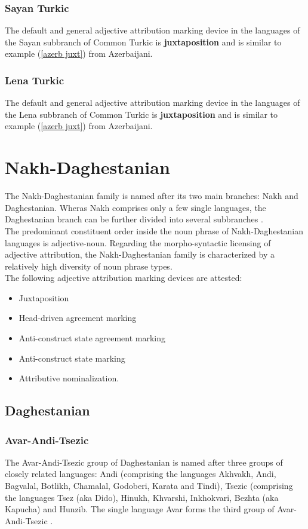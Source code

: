 \subsubsection{Sayan Turkic}
The default and general adjective attribution marking device in the languages of the Sayan subbranch of Common Turkic is \textbf{juxtaposition}  and is similar to example (\ref{azerb juxt}) from Azerbaijani.

\subsubsection{Lena Turkic}
The default and general adjective attribution marking device in the languages of the Lena subbranch of Common Turkic is \textbf{juxtaposition}  and is similar to example (\ref{azerb juxt}) from Azerbaijani.

\section{Nakh-Daghestanian}
The Nakh-Daghestanian family is named after its two main branches: Nakh and Daghestanian. Wheras Nakh comprises only a few single languages, the Daghestanian branch can be further divided into several subbranches \cite[220, 233]{salminen2007}.\\

\noindent The predominant constituent order inside the noun phrase of Nakh-Dagh\-estan\-ian languages is adjective-noun. Regarding the morpho-syntactic licensing of adjective attribution, the Nakh-Daghestanian family is characterized by a relatively high diversity of noun phrase types.\\

\noindent The following adjective attribution marking devices are attested:
\begin{itemize}
\item Juxtaposition
\item Head-driven agreement marking
\item Anti-construct state agreement marking
\item Anti-construct state marking
\item Attributive nominalization.
\end{itemize}

\subsection{Daghestanian}

\subsubsection{Avar-Andi-Tsezic}
The Avar-Andi-Tsezic group of Daghestanian is named after three groups of closely related languages: Andi (comprising the languages Akhvakh, Andi, Bagvalal, Botlikh, Chamalal, Godoberi, Karata and Tindi), Tsezic (comprising the languages Tsez (aka Dido), Hinukh, Khvarshi, Inkhokvari, Bezhta (aka Kapucha) and Hunzib. The single language Avar forms the third group of Avar-Andi-Tsezic \citep[220, 233]{salminen2007}.\\


